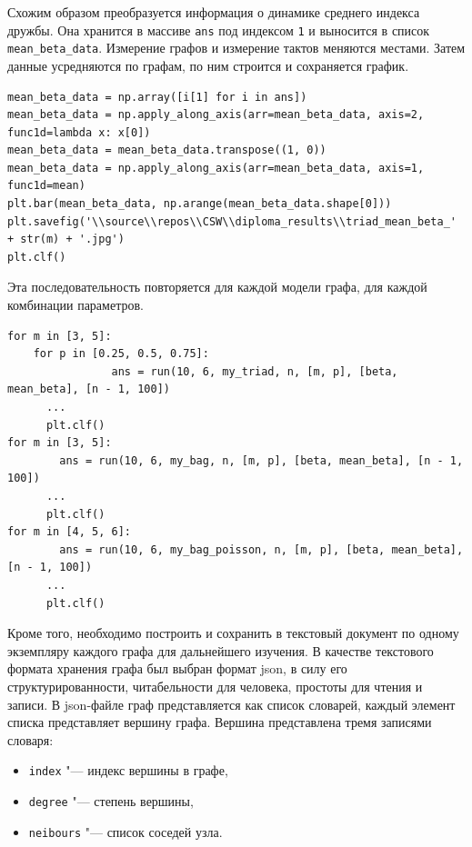 \documentclass[bachelor, och, diploma]{SCWorks}
\begin{document}
Схожим образом преобразуется информация о динамике среднего индекса дружбы. Она хранится в массиве \texttt{ans} под индексом \texttt{1} и выносится в список \texttt{mean_beta_data}. Измерение графов и измерение тактов меняются местами. Затем данные усредняются по графам, по ним строится и сохраняется график.
\begin{verbatim}
mean_beta_data = np.array([i[1] for i in ans])
mean_beta_data = np.apply_along_axis(arr=mean_beta_data, axis=2, func1d=lambda x: x[0])
mean_beta_data = mean_beta_data.transpose((1, 0))
mean_beta_data = np.apply_along_axis(arr=mean_beta_data, axis=1, func1d=mean)
plt.bar(mean_beta_data, np.arange(mean_beta_data.shape[0]))
plt.savefig('\\source\\repos\\CSW\\diploma_results\\triad_mean_beta_' + str(m) + '.jpg')
plt.clf()
\end{verbatim}

Эта последовательность повторяется для каждой модели графа, для каждой комбинации параметров.
\begin{verbatim}
for m in [3, 5]:
    for p in [0.25, 0.5, 0.75]:
  				ans = run(10, 6, my_triad, n, [m, p], [beta, mean_beta], [n - 1, 100])
      ...
      plt.clf()
for m in [3, 5]:
   		ans = run(10, 6, my_bag, n, [m, p], [beta, mean_beta], [n - 1, 100])
      ...
      plt.clf()
for m in [4, 5, 6]:
   		ans = run(10, 6, my_bag_poisson, n, [m, p], [beta, mean_beta], [n - 1, 100])
      ...
      plt.clf()
\end{verbatim}

Кроме того, необходимо построить и сохранить в текстовый документ по одному экземпляру каждого графа для дальнейшего изучения. В качестве текстового формата хранения графа был выбран формат json, в силу его структурированности, читабельности для человека, простоты для чтения и записи. В json-файле граф представляется как список словарей, каждый элемент списка представляет вершину графа. Вершина представлена тремя записями словаря: 
\begin{itemize}
\item \texttt{index} "--- индекс вершины в графе,
\item \texttt{degree} "--- степень вершины, 
\item \texttt{neibours} "--- список соседей узла. 
\end{itemize} 
\end{document}
